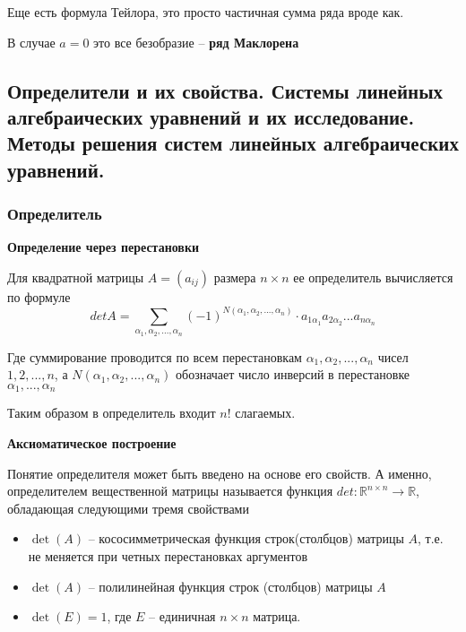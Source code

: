 \documentclass{article}
\begin{document}
Еще есть формула Тейлора, это просто частичная сумма ряда вроде как.

В случае $a = 0$ это все безобразие -- {\bf ряд Маклорена}


\subsection{Определители и их свойства. Системы линейных алгебраических уравнений и их исследование. Методы решения систем линейных алгебраических уравнений.}

\subsubsection{Определитель}


{\bf Определение через перестановки}

Для квадратной матрицы $A = (a_{ij})$ размера $n \times n$ ее определитель вычисляется по формуле $$det A = \sum\limits_{\alpha_1, \alpha_2, ..., \alpha_n}(-1)^{N(\alpha_1, \alpha_2, ..., \alpha_n)} \cdot a_{1 \alpha_1} a_{2 \alpha_2} ... a_{n \alpha_n}$$

Где суммирование проводится по всем перестановкам $\alpha_1, \alpha_2, ..., \alpha_n$ чисел $1, 2, ..., n$, а $N(\alpha_1, \alpha_2, ..., \alpha_n)$ обозначает число инверсий в перестановке $\alpha_1, ..., \alpha_n$

Таким образом в определитель входит $n!$ слагаемых.


{\bf Аксиоматическое построение}

Понятие определителя может быть введено на основе его свойств. А именно, определителем вещественной матрицы называется функция $det: \mathbb{R}^{n \times n} \rightarrow \mathbb{R}$, обладающая следующими тремя свойствами

\begin{itemize}
	\item $\det(A)$ -- кососимметрическая функция строк(столбцов) матрицы $A$, т.е. не меняется при четных перестановках аргументов
	\item $\det(A)$ -- полилинейная функция строк (столбцов) матрицы $A$
	\item $\det(E) = 1$, где $E$ -- единичная $n \times n$ матрица.
\end{itemize}
\end{document}
